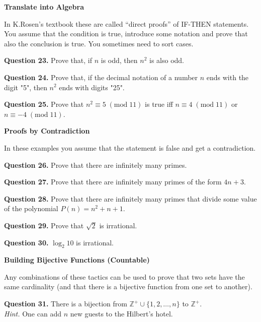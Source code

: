 \documentclass[jou]{apa6}
\begin{document}
\vspace{6pt}
{\bf Translate into Algebra}

In K.Rosen's textbook these are called ``direct proofs''
of IF-THEN statements. 
You assume that the condition is true, introduce some notation and 
prove that also the conclusion is true.
You sometimes need to sort cases. 

\vspace{6pt}
{\bf Question 23.} Prove that, if $n$ is odd, then $n^2$ is also odd. 

\vspace{6pt}
{\bf Question 24.} Prove that, if the decimal notation of a number $n$ ends with the digit "5", 
then $n^2$ ends with digits "25". 

\vspace{6pt}
{\bf Question 25.}
Prove that $n^2 \equiv 5\;(\text{mod}\;11)$ is true
iff
$n \equiv 4\;(\text{mod}\;11)$ 
or $n \equiv -4\;(\text{mod}\;11)$.

\vspace{20pt}
{\bf Proofs by Contradiction}

In these examples you assume that the statement is false
and get a contradiction.


\vspace{6pt}
{\bf Question 26.} Prove that there are infinitely many primes.

\vspace{6pt}
{\bf Question 27.} Prove that there are infinitely many primes of the form $4n+3$. 

\vspace{6pt}
{\bf Question 28.} Prove that there are infinitely many primes
that divide some value of the polynomial 
$P(n) = n^2 + n + 1$. 

\vspace{6pt}
{\bf Question 29.}
Prove that $\sqrt{2}$ is irrational.

\vspace{6pt}
{\bf Question 30.}
$\log_2 10$ is irrational.


\vspace{20pt}
{\bf Building Bijective Functions (Countable)}

Any combinations of these tactics can be used
to prove that two sets have the same cardinality
(and that there is a bijective function from one set to another).

\vspace{6pt}
{\bf Question 31.}
There is a bijection from $\mathbb{Z}^{+} \cup \{ 1,2,\ldots,n \}$
to $\mathbb{Z}^{+}$.\\
{\em Hint.} One can add $n$ new guests to the Hilbert's hotel.
\end{document}
